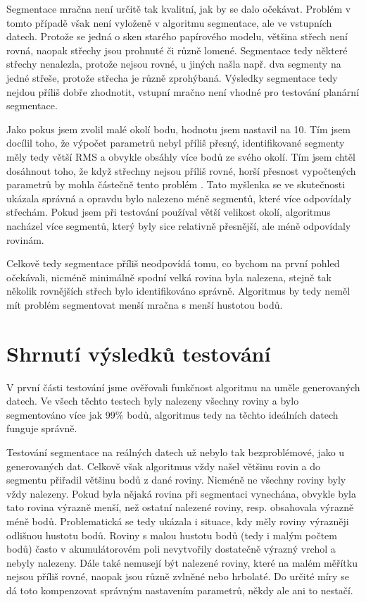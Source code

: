\documentclass[11pt,twoside,a4paper]{book}
\begin{document}
Segmentace mračna není určitě tak kvalitní, jak by se dalo očekávat. Problém v tomto případě však není vyloženě v algoritmu segmentace, ale ve vstupních datech. Protože se jedná o sken starého papírového modelu, většina střech není rovná, naopak střechy jsou prohnuté či různě lomené. Segmentace tedy některé střechy nenalezla, protože nejsou rovné, u jiných našla např. dva segmenty na jedné střeše, protože střecha je různě zprohýbaná. Výsledky segmentace tedy nejdou příliš dobře zhodnotit, vstupní mračno není vhodné pro testování planární segmentace.

Jako pokus jsem zvolil malé okolí bodu, hodnotu jsem nastavil na 10. Tím jsem docílil toho, že výpočet parametrů nebyl příliš přesný, identifikované segmenty měly tedy větší RMS a obvykle obsáhly více bodů ze svého okolí. Tím jsem chtěl dosáhnout toho, že když střechny nejsou příliš rovné, horší přesnost vypočtených parametrů by mohla částečně tento problém . Tato myšlenka se ve skutečnosti ukázala správná a opravdu bylo nalezeno méně segmentů, které více odpovídaly střechám. Pokud jsem při testování používal větší velikost okolí, algoritmus nacházel více segmentů, který byly sice relativně přesnější, ale méně odpovídaly  rovinám.

Celkově tedy segmentace příliš neodpovídá tomu, co bychom na první pohled očekávali, nicméně minimálně spodní velká rovina byla nalezena, stejně tak několik rovnějších střech bylo identifikováno správně. Algoritmus by tedy neměl mít problém segmentovat menší mračna s menší hustotou bodů.


\newpage
\section{Shrnutí výsledků testování}

V první části testování jsme ověřovali funkčnost algoritmu na uměle generovaných datech. Ve všech těchto testech byly nalezeny všechny roviny a bylo segmentováno více jak 99\% bodů, algoritmus tedy na těchto ideálních datech funguje správně.

Testování segmentace na reálných datech už nebylo tak bezproblémové, jako u generovaných dat. Celkově však algoritmus vždy našel většinu rovin a do segmentu přiřadil většinu bodů z dané roviny. Nicméně ne všechny roviny byly vždy nalezeny. Pokud byla nějaká rovina při segmentaci vynechána, obvykle byla tato rovina výrazně menší, než ostatní nalezené roviny, resp. obsahovala výrazně méně bodů. Problematická se tedy ukázala i situace, kdy měly roviny výrazněji odlišnou hustotu bodů. Roviny s malou hustotu bodů (tedy i malým počtem bodů) často v akumulátorovém poli nevytvořily dostatečně výrazný vrchol a nebyly nalezeny. Dále také nemusejí být nalezené roviny, které na malém měřítku nejsou příliš rovné, naopak jsou různě zvlněné nebo hrbolaté. Do určité míry se dá toto kompenzovat správným nastavením parametrů, někdy ale ani to nestačí. 
\end{document}
